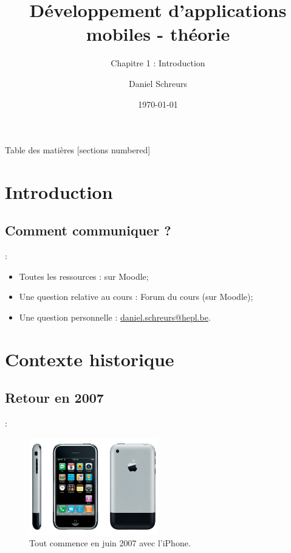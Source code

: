 \documentclass[10pt]{beamer}
\title{Développement d'applications mobiles - théorie}
\subtitle{Chapitre 1 : Introduction}
\date{\today}
\author{Daniel Schreurs}
\institute{Haute École de Province de Liège}
\begin{document}
\maketitle

\begin{frame}[allowframebreaks]{Table des matières}
    [sections numbered]
    \tableofcontents
\end{frame}

\section{Introduction}

\subsection{Comment communiquer ?}
\begin{frame}{\secname : \subsecname}
    \begin{itemize}
        \item Toutes les ressources : sur Moodle;
        \item Une question relative au cours : Forum du cours (sur Moodle);
        \item Une question personnelle : \href{mailto:daniel.schreurs@hepl.be}{daniel.schreurs@hepl.be}.
    \end{itemize}
\end{frame}

\section{Contexte historique}
\subsection{Retour en 2007}
\begin{frame}[fragile,t]{\secname : \subsecname}
    \begin{figure}
        \begin{center}
            \includegraphics[width=0.5\textwidth]{../assets/img/Originele-iPhone.jpg}
            \caption*{Tout commence en juin 2007 avec l'iPhone.}
            \label{Fig:Originele-iPhone}
        \end{center}
    \end{figure}
\end{frame}
\end{document}
